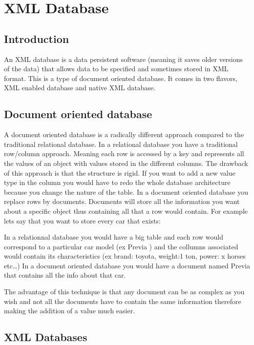 

\chapter{XML Database}
\section{Introduction}
An XML database is a data persistent software (meaning it saves older versions of the data) that allows data to be specified and sometimes stored in XML format. This is a type of document oriented database. It comes in two flavors, XML enabled database and native XML database.
\section{Document oriented database}

A document oriented database is a radically different approach compared to the traditional relational database. In a relational database you have a traditional row/column approach. Meaning each row is accessed by a key and represents all the values of an object with values stored in the different columns. The drawback of this approach is that the structure is rigid. If you want to add a new value type in the column you would have to redo the whole database architecture because you change the nature of the table. In a document oriented database you replace rows by documents. Documents will store all the information you want about a specific object thus containing all that a row would contain. For example lets say that you want to store every car that exists:

    In a relationnal database you would have a big table and each row would correspond to a particular car model (ex Previa ) and the collumns associated would contain its characteristics (ex brand: toyota, weight:1 ton, power: x horses etc…)
    In a document oriented database you would have a document named Previa that contains all the info about that car.

The advantage of this technique is that any document can be as complex as you wish and not all the documents have to contain the same information therefore making the addition of a value much easier.
\section{XML Databases}
